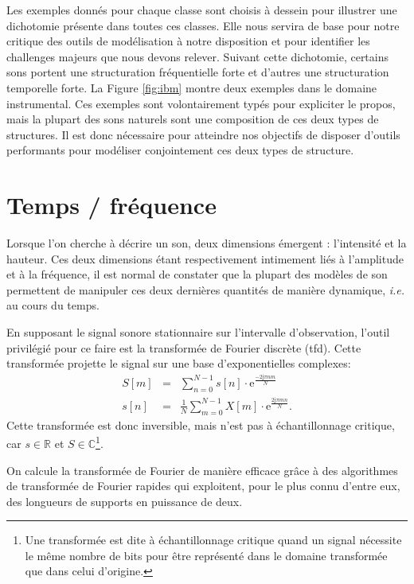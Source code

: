 Les exemples donnés pour chaque classe sont choisis à dessein pour illustrer une dichotomie présente dans toutes ces classes. Elle nous servira de base pour notre critique des outils de modélisation à notre disposition et pour identifier les challenges majeurs que nous devons relever. Suivant cette dichotomie, certains sons portent une structuration fréquentielle forte et d'autres une structuration temporelle forte. La Figure \ref{fig:ibm} montre deux exemples dans le domaine instrumental. Ces exemples sont volontairement typés pour expliciter le propos, mais la plupart des sons naturels sont une composition de ces deux types de structures. Il est donc nécessaire pour atteindre nos objectifs de disposer d'outils performants pour modéliser conjointement ces deux types de structure.

\section{ \nmu Temps / fréquence} \label{sec:tf}

Lorsque l'on cherche à décrire un son, deux dimensions émergent : l'intensité et la hauteur. Ces deux dimensions étant respectivement intimement liés à l'amplitude et à la fréquence, il est normal de constater que la plupart des modèles de son permettent de manipuler ces deux dernières quantités de manière dynamique, \textit{i.e.} au cours du temps.

En supposant le signal sonore stationnaire sur l'intervalle d'observation, l'outil privilégié pour ce faire est la transformée de Fourier discrète (tfd). Cette transformée projette le signal sur une base d'exponentielles complexes:
\begin{eqnarray}
  S[m] &=& \sum_{n=0}^{N-1} s[n] \cdot \mathrm{e}^{\frac{-2 \mathrm{j} \pi nm}{N}} \\
  s[n] &=& \frac{1}{N} \sum_{m=0}^{N-1} X[m] \cdot \mathrm{e}^{\frac{ 2 \mathrm{j} \pi m n }{N}}.
\end{eqnarray}
Cette transformée est donc inversible, mais n'est pas à échantillonnage critique, car $s\in \mathbb{R}$  et $S \in \mathbb{C}$\footnote{Une transformée est dite à échantillonnage critique quand un signal nécessite le même nombre de bits pour être représenté dans le domaine transformée que dans celui d'origine.}.

On calcule la transformée de Fourier de manière efficace grâce à des algorithmes de transformée de Fourier rapides qui exploitent, pour le plus connu d'entre eux, des longueurs de supports en puissance de deux.~\cite{cooley1965algorithm}

